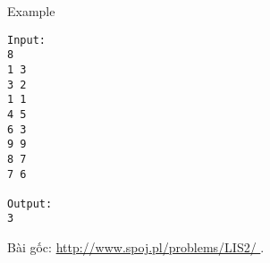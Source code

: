 Example
\begin{verbatim}
Input:
8
1 3
3 2
1 1
4 5
6 3
9 9
8 7
7 6

Output:
3
\end{verbatim}

   Bài gốc:   \href{http://www.spoj.pl/problems/LIS2/}{    http://www.spoj.pl/problems/LIS2/   }   .